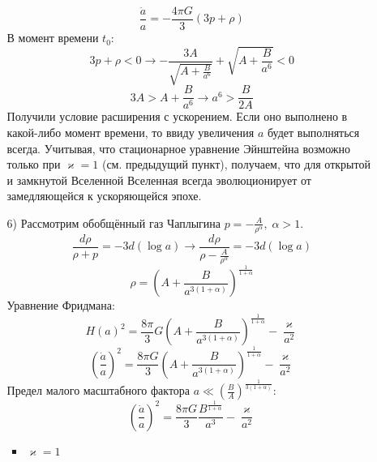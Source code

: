 \documentclass[12pt]{article}
\theoremstyle{definition}
\begin{document}
\begin{enumerate}
\begin{itemize}
        \begin{equation}
            \frac{\ddot{a}}{a}=-\frac{4\pi G}{3}(3p+\rho)
        \end{equation}
        В момент времени $t_0$:
        \begin{equation}
            3p+\rho<0\rightarrow-\frac{3A}{\sqrt{A+\frac{B}{a^6}}}+\sqrt{A+\frac{B}{a^6}}<0
        \end{equation}
        \begin{equation}
            3A>A+\frac{B}{a^6}\rightarrow \boxed{a^6>\frac{B}{2A}}
        \end{equation}
        Получили условие расширения с ускорением. Если оно выполнено в какой-либо момент времени, то ввиду увеличения $a$ будет выполняться всегда. Учитывая, что стационарное уравнение Эйнштейна возможно только при $\varkappa=1$ (см. предыдущий пункт), получаем, что для открытой и замкнутой Вселенной Вселенная всегда эволюционирует от замедляющейся к ускоряющейся эпохе.
        \item[6)] Рассмотрим обобщённый газ Чаплыгина $p=-\frac{A}{\rho^\alpha},\;\alpha>1$.
        \begin{equation}
            \frac{d\rho}{\rho+p}=-3d(\log a)\rightarrow\frac{d\rho}{\rho-\frac{A}{\rho^\alpha}}=-3d(\log a)
        \end{equation}
        \begin{equation}
            \rho=\left(A+\frac{B}{a^{3(1+\alpha)}}\right)^{\frac{1}{1+\alpha}}
        \end{equation}
         Уравнение Фридмана:
        \begin{equation}
            \boxed{H(a)^2=\frac{8\pi}{3}G\left(A+\frac{B}{a^{3(1+\alpha)}}\right)^{\frac{1}{1+\alpha}}-\frac{\varkappa}{a^2}}
        \end{equation}
        \begin{equation}
            \left(\frac{\dot{a}}{a}\right)^2=\frac{8\pi G}{3}\left(A+\frac{B}{a^{3(1+\alpha)}}\right)^{\frac{1}{1+\alpha}}-\frac{\varkappa}{a^2}
        \end{equation}
        Предел малого масштабного фактора $a\ll\left(\frac{B}{A}\right)^\frac{1}{3(1+\alpha)}$:
        \begin{equation}
            \left(\frac{\dot{a}}{a}\right)^2=\frac{8\pi G}{3}\frac{B^\frac{1}{1+\alpha}}{a^3}-\frac{\varkappa}{a^2}
        \end{equation}
        \begin{itemize}
            \item $\varkappa=1$

\end{itemize}
\end{itemize}
\end{enumerate}
\end{document}
